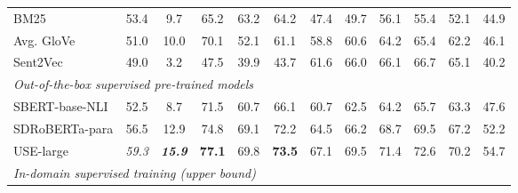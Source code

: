 \documentclass[11pt,a4paper]{article}
\begin{document}
\begin{table*}[t]
{\begin{tabular}{|l|c|c|ccc|ccccc|c|}
\hline
BM25              & {53.4}                       & 9.7                    & 65.2                   & 63.2                   & 64.2                      & 47.4           & 49.7           & 56.1                           & 55.4           & 52.1                      & 44.9                   \\
Avg. GloVe        & 51.0                               & {10.0}           & {70.1}           & {52.1}           & {61.1}              & 58.8           & 60.6           & 64.2                           & 65.4           & 62.2                      & {46.1}           \\
Sent2Vec          & 49.0                               & 3.2                    & 47.5                   & 39.9                   & 43.7                      & {61.6}   & {66.0}   & {66.1}                   & {66.7}   & {65.1}              & 40.2                   \\ 
\hline
\multicolumn{12}{|l|}{ \textit{Out-of-the-box supervised pre-trained models} }                                                                                                                                                                                                                         \\ 
\hline
SBERT-base-NLI    & 52.5                               & 8.7                    & 71.5                   & 60.7                   & 66.1                      & 60.7           & 62.5           & 64.2                           & 65.7           & 63.3                      & 47.6                   \\
SDRoBERTa-para    & 56.5                               & 12.9                   & 74.8                   & 69.1                   & 72.2                      & 64.5           & 66.2           & 68.7                           & 69.5           & 67.2                      & 52.2                   \\
USE-large         & \textit{59.3}                       & \textit{\textbf{15.9}}  & \textbf{77.1}  & 69.8           & \textbf{73.5}     & 67.1   & 69.5   & 71.4                   & 72.6   & {70.2}              & {54.7}           \\ 
\hline
\multicolumn{12}{|l|}{ \textit{In-domain supervised training (upper bound)} }                                                                                                                                                                                                                          \\ 

\end{tabular}}
\end{table*}
\end{document}
